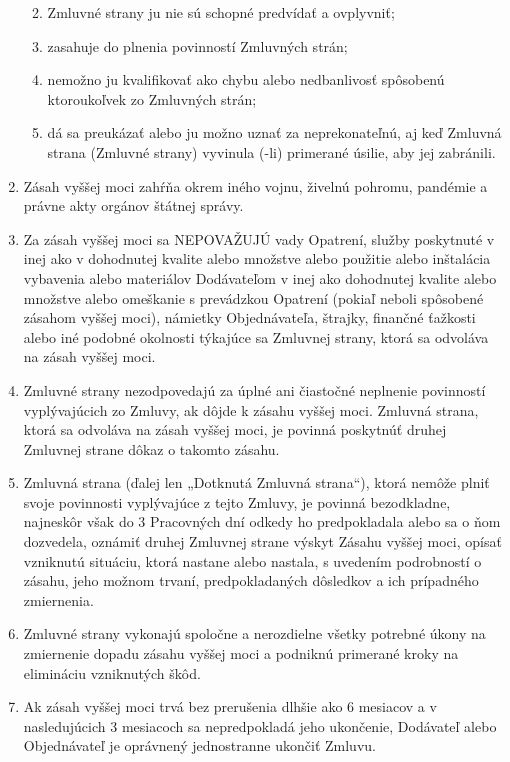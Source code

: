 \begin{multicols}{2}
\begin{enumerate}
  \begin{enumerate}
  \def\labelenumii{\arabic{enumii}.}
  \item
    Zmluvné strany ju nie sú schopné predvídať a ovplyvniť;
  \item
    zasahuje do plnenia povinností Zmluvných strán;
  \item
    nemožno ju kvalifikovať ako chybu alebo nedbanlivosť spôsobenú
    ktoroukoľvek zo Zmluvných strán;
  \item
    dá sa preukázať alebo ju možno uznať za neprekonateľnú, aj keď
    Zmluvná strana (Zmluvné strany) vyvinula (-li) primerané úsilie, aby
    jej zabránili.
  \end{enumerate}
\item
  Zásah vyššej moci zahŕňa okrem iného vojnu, živelnú pohromu, pandémie
  a právne akty orgánov štátnej správy.
\item
  Za zásah vyššej moci sa NEPOVAŽUJÚ vady Opatrení, služby poskytnuté v
  inej ako v dohodnutej kvalite alebo množstve alebo použitie alebo
  inštalácia vybavenia alebo materiálov Dodávateľom v inej ako
  dohodnutej kvalite alebo množstve alebo omeškanie s prevádzkou
  Opatrení (pokiaľ neboli spôsobené zásahom vyššej moci), námietky
  Objednávateľa, štrajky, finančné ťažkosti alebo iné podobné okolnosti
  týkajúce sa Zmluvnej strany, ktorá sa odvoláva na zásah vyššej moci.
\item
  Zmluvné strany nezodpovedajú za úplné ani čiastočné neplnenie
  povinností vyplývajúcich zo Zmluvy, ak dôjde k zásahu vyššej moci.
  Zmluvná strana, ktorá sa odvoláva na zásah vyššej moci, je povinná
  poskytnúť druhej Zmluvnej strane dôkaz o takomto zásahu.
\item
  Zmluvná strana (ďalej len „Dotknutá Zmluvná strana``), ktorá nemôže
  plniť svoje povinnosti vyplývajúce z tejto Zmluvy, je povinná
  bezodkladne, najneskôr však do 3 Pracovných dní odkedy ho
  predpokladala alebo sa o ňom dozvedela, oznámiť druhej Zmluvnej strane
  výskyt Zásahu vyššej moci, opísať vzniknutú situáciu, ktorá nastane
  alebo nastala, s uvedením podrobností o zásahu, jeho možnom trvaní,
  predpokladaných dôsledkov a ich prípadného zmiernenia.
\item
  Zmluvné strany vykonajú spoločne a nerozdielne všetky potrebné úkony
  na zmiernenie dopadu zásahu vyššej moci a podniknú primerané kroky na
  elimináciu vzniknutých škôd.
\item
  Ak zásah vyššej moci trvá bez prerušenia dlhšie ako 6 mesiacov a v
  nasledujúcich 3 mesiacoch sa nepredpokladá jeho ukončenie, Dodávateľ
  alebo Objednávateľ je oprávnený jednostranne ukončiť Zmluvu.
\end{enumerate}


\end{multicols}
